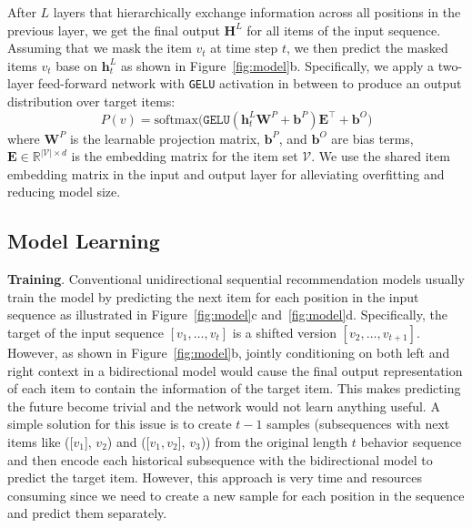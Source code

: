 After $L$ layers that hierarchically exchange information across all positions in the previous layer, we get the final output $\bm{H}^L$ for all items of the input sequence.
Assuming that we mask the item $v_t$ at time step $t$, we then predict the masked items $v_t$ base on $\bm{h}_t^L$ as shown in Figure~\ref{fig:model}b.
Specifically, we apply a two-layer feed-forward network with \texttt{GELU} activation in between to produce an output distribution over target items:
\begin{equation}
    P(v) = \mathrm{softmax}\bigl(\mathtt{GELU}(\bm{h}_t^L \bm{W}^P +\bm{b}^P) \bm{E}^{\top} + \bm{b}^O \bigr)
    \label{eq:prob}
\end{equation}
where $\bm{W}^P$ is the learnable projection matrix, $\bm{b}^P$, and $\bm{b}^O$ are bias terms, $\bm{E}\in \mathbb{R}^{|\mathcal{V}|\times d}$ is the embedding matrix for the item set $\mathcal{V}$.
We use the shared item embedding matrix in the input and output layer for alleviating overfitting and reducing model size.


\subsection{Model Learning}
\label{sec:ml}

\textbf{Training}. 
Conventional unidirectional sequential recommendation models usually train the model by predicting the next item for each position in the input sequence as illustrated in Figure~\ref{fig:model}c and~\ref{fig:model}d.
Specifically, the target of the input sequence $[v_1,\dots,v_{t}]$ is a shifted version $[v_2,\dots,v_{t+1}]$.
However, as shown in Figure~\ref{fig:model}b, jointly conditioning on both left and right context in a bidirectional model would cause the final output representation of each item to contain the information of the target item.
This makes predicting the future become trivial and the network would not learn anything useful.
A simple solution for this issue is to create $t-1$ samples (subsequences with next items like ([$v_1$], $v_2$) and ([$v_1,v_2$], $v_3$)) from the original length $t$ behavior sequence and then encode each historical subsequence with the bidirectional model to predict the target item. 
However, this approach is very time and resources consuming since we need to create a new sample for each position in the sequence and predict them separately.

